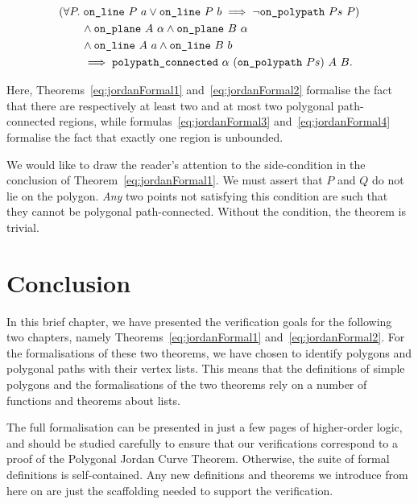 \begin{equation}\label{eq:jordanFormal4}
  \begin{split}
    &(\forall P.\;\code{on\_line}\ P\ a \vee \code{on\_line}\ P\ b\implies \neg\code{on\_polypath}\ Ps\ P)\\
    &\qquad\wedge\code{on\_plane}\ A\ \alpha \wedge\code{on\_plane}\ B\ \alpha\\
    &\qquad\wedge\code{on\_line}\ A\ a \wedge\code{on\_line}\ B\ b\\
    &\qquad\implies \code{polypath\_connected}\ \alpha\ (\code{on\_polypath}\ Ps)\ A\ B.
  \end{split}
\end{equation}

Here, Theorems~\ref{eq:jordanFormal1} and~\ref{eq:jordanFormal2} formalise the fact that there are respectively at least two and at most two polygonal path-connected regions, while formulas~\ref{eq:jordanFormal3} and~\ref{eq:jordanFormal4} formalise the fact that exactly one region is unbounded.

We would like to draw the reader's attention to the side-condition in the conclusion of Theorem~\ref{eq:jordanFormal1}. We must assert that $P$ and $Q$ do not lie on the polygon. \emph{Any} two points not satisfying this condition are such that they cannot be polygonal path-connected. Without the condition, the theorem is trivial.

\section{Conclusion}
In this brief chapter, we have presented the verification goals for the following two chapters, namely Theorems~\ref{eq:jordanFormal1} and~\ref{eq:jordanFormal2}. For the formalisations of these two theorems, we have chosen to identify polygons and polygonal paths with their vertex lists. This means that the definitions of simple polygons and the formalisations of the two theorems rely on a number of functions and theorems about lists.

The full formalisation can be presented in just a few pages of higher-order logic, and should be studied carefully to ensure that our verifications correspond to a proof of the Polygonal Jordan Curve Theorem. Otherwise, the suite of formal definitions is self-contained. Any new definitions and theorems we introduce from here on are just the scaffolding needed to support the verification.

